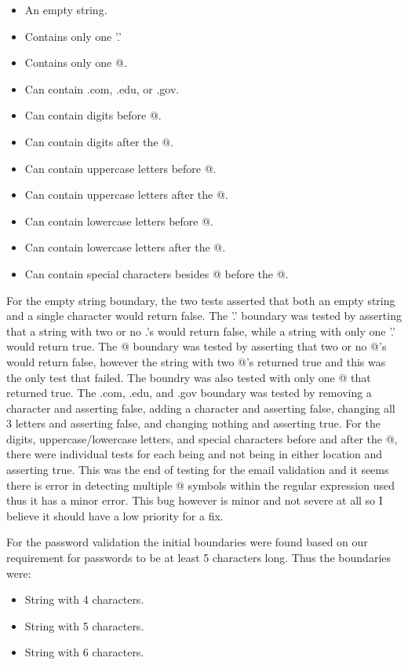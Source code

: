 \documentclass[a4paper]{article}
\begin{document}
\begin{itemize}
   \item An empty string.
   \item Contains only one '.'
   \item Contains only one @.
   \item Can contain .com, .edu, or .gov.
   \item Can contain digits before @.
   \item Can contain digits after the @.
   \item Can contain uppercase letters before @.
   \item Can contain uppercase letters after the @.
   \item Can contain lowercase letters before @.
   \item Can contain lowercase letters after the @.
   \item Can contain special characters besides @ before the @.
\end{itemize}

For the empty string boundary, the two tests asserted that both an empty string and a single character would return false.
The '.' boundary was tested by asserting that a string with two or no .'s would return false, while a string with only one '.' would return true.
The @ boundary was tested by asserting that two or no @'s would return false, however the string with two @'s returned true and this was the only test that failed.
The boundry was also tested with only one @ that returned true.
The .com, .edu, and .gov boundary was tested by removing a character and asserting false, adding a character and asserting false, changing all 3 letters and asserting false, and changing nothing and asserting true.
For the digits, uppercase/lowercase letters, and special characters before and after the @, there were individual tests for each being and not being in either location and asserting true.
This was the end of testing for the email validation and it seems there is error in detecting multiple @ symbols within the regular expression used thus it has a minor error.
This bug however is minor and not severe at all so I believe it should have a low priority for a fix.

For the password validation the initial boundaries were found based on our requirement for passwords to be at least 5 characters long.
Thus the boundaries were:

\begin{itemize}
   \item String with 4 characters.
   \item String with 5 characters.
   \item String with 6 characters.
\end{itemize}
\end{document}
